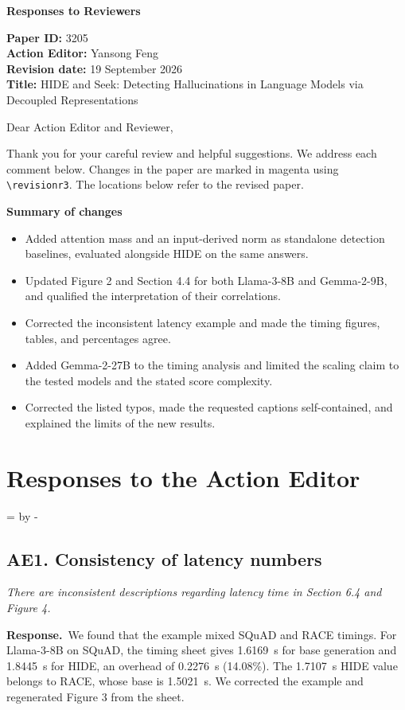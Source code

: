 \documentclass[11pt]{article}
\newcommand{\Needspace}[1]{\par\begingroup
  \dimen0=\pagegoal\advance\dimen0 by -\pagetotal
  \ifdim\dimen0<#1\relax\newpage\fi\endgroup}
\newcommand{\reviewcomment}[2]{%
  \Needspace{9\baselineskip}%
  \subsection*{#1}%
  \begin{tcolorbox}[enhanced,breakable,colback=gray!8,colframe=gray!50,
    boxrule=0pt,borderline west={2pt}{0pt}{gray!55},sharp corners]
  \itshape #2
  \end{tcolorbox}}
\newcommand{\response}{\textbf{Response.}\ }
\begin{document}
\begin{center}\Large\textbf{Responses to Reviewers}\end{center}
\textbf{Paper ID:} 3205\\
\textbf{Action Editor:} Yansong Feng\\
\textbf{Revision date:} 19 September 2026\\
\textbf{Title:} HIDE and Seek: Detecting Hallucinations in Language Models via Decoupled Representations

Dear Action Editor and Reviewer,

Thank you for your careful review and helpful suggestions. We address each comment below. Changes in the paper are marked in magenta using \texttt{\textbackslash revisionr3}. The locations below refer to the revised paper.

\textbf{Summary of changes}
\begin{itemize}[leftmargin=*,nosep]
\item Added attention mass and an input-derived norm as standalone detection baselines, evaluated alongside HIDE on the same answers.
\item Updated Figure 2 and Section 4.4 for both Llama-3-8B and Gemma-2-9B, and qualified the interpretation of their correlations.
\item Corrected the inconsistent latency example and made the timing figures, tables, and percentages agree.
\item Added Gemma-2-27B to the timing analysis and limited the scaling claim to the tested models and the stated score complexity.
\item Corrected the listed typos, made the requested captions self-contained, and explained the limits of the new results.
\end{itemize}

\section*{Responses to the Action Editor}

\reviewcomment{AE1. Consistency of latency numbers}{There are inconsistent descriptions regarding latency time in Section 6.4 and Figure 4.}
\response We found that the example mixed SQuAD and RACE timings. For Llama-3-8B on SQuAD, the timing sheet gives 1.6169~s for base generation and 1.8445~s for HIDE, an overhead of 0.2276~s (14.08\%). The 1.7107~s HIDE value belongs to RACE, whose base is 1.5021~s. We corrected the example and regenerated Figure 3 from the sheet.
\end{document}
